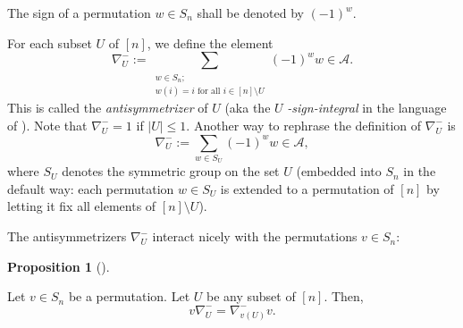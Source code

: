\documentclass[numbers=enddot,12pt,final,onecolumn,notitlepage]{scrartcl}%
\numberwithin{exer}{subsection}
\theoremstyle{definition}
\newtheorem{prop}[theo]{Proposition}
\newenvironment{proposition}[1][]
{\begin{prop}[#1]\begin{leftbar}}
{\end{leftbar}\end{prop}}
\let\sumnonlimits\sum
\renewcommand{\sum}{\sumnonlimits\limits}
\begin{document}
The sign of a permutation $w\in S_{n}$ shall be denoted by $\left(  -1\right)
^{w}$.

For each subset $U$ of $\left[  n\right]  $, we define the element%
\begin{equation}
\nabla_{U}^{-}:=\sum_{\substack{w\in S_{n};\\w\left(  i\right)  =i\text{ for
all }i\in\left[  n\right]  \setminus U}}\left(  -1\right)  ^{w}w\in
\mathcal{A}. \label{eq.Nab-U.1}%
\end{equation}
This is called the \emph{antisymmetrizer} of $U$ (aka the $U$%
\emph{-sign-integral} in the language of \cite[Definition 3.7.1]{sga}). Note
that $\nabla_{U}^{-}=1$ if $\left\vert U\right\vert \leq1$. Another way to
rephrase the definition of $\nabla_{U}^{-}$ is
\begin{equation}
\nabla_{U}^{-}:=\sum_{w\in S_{U}}\left(  -1\right)  ^{w}w\in\mathcal{A},
\label{eq.Nab-U.2}%
\end{equation}
where $S_{U}$ denotes the symmetric group on the set $U$ (embedded into
$S_{n}$ in the default way: each permutation $w\in S_{U}$ is extended to a
permutation of $\left[  n\right]  $ by letting it fix all elements of $\left[
n\right]  \setminus U$).

The antisymmetrizers $\nabla_{U}^{-}$ interact nicely with the permutations
$v\in S_{n}$:

\begin{proposition}
\label{prop.wNab-U}Let $v\in S_{n}$ be a permutation. Let $U$ be any subset of
$\left[  n\right]  $. Then,%
\begin{equation}
v\nabla_{U}^{-}=\nabla_{v\left(  U\right)  }^{-}v. \label{eq.wNab-U}%
\end{equation}

\end{proposition}
\end{document}
